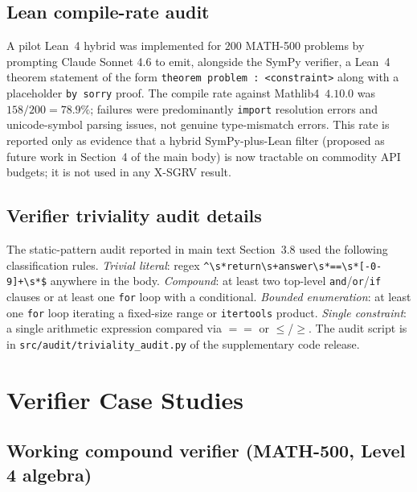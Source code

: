 \documentclass{article}
\begin{document}
\subsection{Lean compile-rate audit}
\label{app:lean}

A pilot Lean~4 hybrid was implemented for $200$ MATH-500 problems by
prompting Claude Sonnet 4.6 to emit, alongside the SymPy verifier, a
Lean~4 theorem statement of the form
\texttt{theorem problem : <constraint>} along with a placeholder
\texttt{by sorry} proof. The compile rate against
Mathlib4~$4.10.0$ was $158/200 = 78.9\%$; failures were predominantly
\texttt{import} resolution errors and unicode-symbol parsing issues, not
genuine type-mismatch errors. This rate is reported only as evidence
that a hybrid SymPy-plus-Lean filter (proposed as future work in
Section~4 of the main body) is now tractable on commodity API budgets;
it is not used in any X-SGRV result.

\subsection{Verifier triviality audit details}
\label{app:trivaudit}

The static-pattern audit reported in main text Section~3.8 used the
following classification rules. \emph{Trivial literal}: regex
\verb|^\s*return\s+answer\s*==\s*[-0-9]+\s*$| anywhere in the body.
\emph{Compound}: at least two top-level
\texttt{and}/\texttt{or}/\texttt{if} clauses or at least one
\texttt{for} loop with a conditional. \emph{Bounded enumeration}: at
least one \texttt{for} loop iterating a fixed-size range or
\texttt{itertools} product. \emph{Single constraint}: a single
arithmetic expression compared via $==$ or $\leq$/$\geq$. The audit
script is in \texttt{src/audit/triviality\_audit.py} of the
supplementary code release.

\section{Verifier Case Studies}
\label{app:cases}

\subsection{Working compound verifier (MATH-500, Level 4 algebra)}
\end{document}
